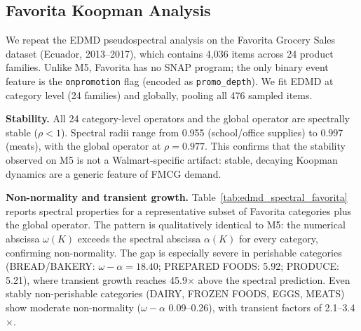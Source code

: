 \documentclass[10pt]{article} %
\theoremstyle{plain}
\theoremstyle{definition}
\begin{document}
\subsection{Favorita Koopman Analysis}

We repeat the EDMD pseudospectral analysis on the Favorita Grocery Sales dataset (Ecuador, 2013--2017), which contains 4,036 items across 24 product families. Unlike M5, Favorita has no SNAP program; the only binary event feature is the \texttt{onpromotion} flag (encoded as \texttt{promo\_depth}). We fit EDMD at category level (24 families) and globally, pooling all 476 sampled items.

\textbf{Stability.} All 24 category-level operators and the global operator are spectrally stable ($\rho < 1$). Spectral radii range from 0.955 (school/office supplies) to 0.997 (meats), with the global operator at $\rho = 0.977$. This confirms that the stability observed on M5 is not a Walmart-specific artifact: stable, decaying Koopman dynamics are a generic feature of FMCG demand.

\textbf{Non-normality and transient growth.} Table~\ref{tab:edmd_spectral_favorita} reports spectral properties for a representative subset of Favorita categories plus the global operator. The pattern is qualitatively identical to M5: the numerical abscissa $\omega(K)$ exceeds the spectral abscissa $\alpha(K)$ for every category, confirming non-normality. The gap is especially severe in perishable categories (BREAD/BAKERY: $\omega - \alpha = 18.40$; PREPARED FOODS: 5.92; PRODUCE: 5.21), where transient growth reaches 45.9$\times$ above the spectral prediction. Even stably non-perishable categories (DAIRY, FROZEN FOODS, EGGS, MEATS) show moderate non-normality ($\omega - \alpha$ 0.09--0.26), with transient factors of 2.1--3.4$\times$.
\end{document}
